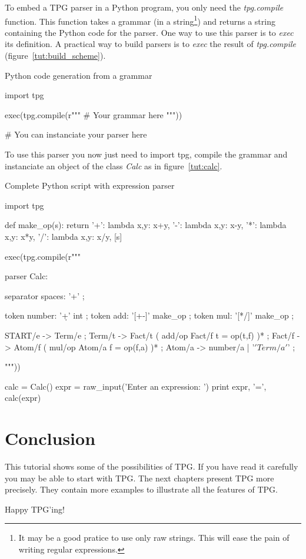 To embed a TPG parser in a Python program, you only need the \emph{tpg.compile} function.
This function takes a grammar (in a string\footnote{It may be a good pratice to use only raw strings. This will ease the pain of writing regular expressions.}) and returns a string containing the Python code for the parser.
One way to use this parser is to \emph{exec} its definition.
A practical way to build parsers is to \emph{exec} the result of \emph{tpg.compile} (figure~\ref{tut:build_scheme}).

\begin{code}
\caption{Python code generation from a grammar}				\label{tut:build_scheme}
\begin{verbatimtab}[4]
import tpg

exec(tpg.compile(r""" # Your grammar here """))

# You can instanciate your parser here
\end{verbatimtab}
\end{code}

To use this parser you now just need to import tpg, compile the grammar and instanciate an object of the class \emph{Calc} as in figure~\ref{tut:calc}.

\begin{code}
\caption{Complete Python script with expression parser}		\label{tut:calc}
\begin{verbatimtab}[4]
import tpg

def make_op(s):
	return {
		'+': lambda x,y: x+y,
		'-': lambda x,y: x-y,
		'*': lambda x,y: x*y,
		'/': lambda x,y: x/y,
	}[s]

exec(tpg.compile(r"""

parser Calc:

	separator spaces: '\s+' ;

	token number: '\d+' int ;
	token add: '[+-]' make_op ;
	token mul: '[*/]' make_op ;

	START/e -> Term/e ;
	Term/t -> Fact/t ( add/op Fact/f {{ t = op(t,f) }} )* ;
	Fact/f -> Atom/f ( mul/op Atom/a {{ f = op(f,a) }} )* ;
	Atom/a -> number/a | '\(' Term/a '\)' ;

"""))

calc = Calc()
expr = raw_input('Enter an expression: ')
print expr, '=', calc(expr)
\end{verbatimtab}
\end{code}

\clearpage

\section{Conclusion}

This tutorial shows some of the possibilities of TPG.
If you have read it carefully you may be able to start with TPG.
The next chapters present TPG more precisely.
They contain more examples to illustrate all the features of TPG.

Happy TPG'ing!
